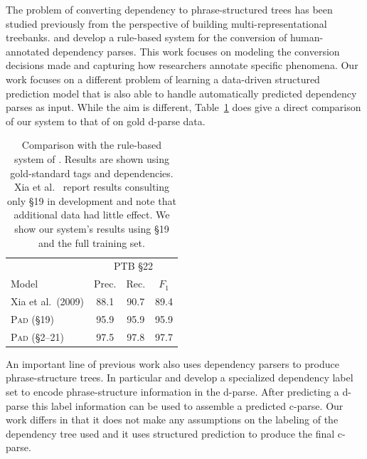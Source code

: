 \documentclass[11pt,letterpaper]{article}
\newcommand{\ParseName}{\textsc{Pad}\xspace}
\newcommand{\nascomment}[1]{\textcolor{blue}{\bf \small [#1 --nas]}}
\begin{document}
The problem of converting dependency to phrase-structured trees has
been studied previously from the perspective of building
multi-representational treebanks.   and
 develop a rule-based system for the
conversion of human-annotated dependency parses. This work focuses on
modeling the conversion decisions made and capturing how researchers
annotate specific phenomena. Our work focuses on a different problem
of learning a data-driven structured prediction model that is also
able to handle automatically predicted dependency parses as
input. While the aim is different, Table~\ref{tab:convert} does give a
direct comparison of our system to that of  on 
gold d-parse data.


\begin{table}
  \centering
  \small
  \begin{tabular}{lccc}

    \toprule
    & \multicolumn{3}{c}{PTB \S 22} \\
    Model & Prec. & Rec. & $F_1$  \\
    \midrule

   
    Xia et al.~(2009)    & 88.1 & 90.7 & 89.4 \\
    \ParseName{} (\S 19)  & 95.9 & 95.9 & 95.9    \\
    \ParseName{}  (\S 2--21) & 97.5 & 97.8 & 97.7    \\
    \bottomrule

  \end{tabular}
  \caption{Comparison with the rule-based system of .
    Results are shown using gold-standard tags and
    dependencies.  Xia et al.~
 report results consulting only \S 19 in development and
note that additional data had little effect.  We show our system's
results using \S 19 and the full training set. 
  \label{tab:convert}}
\end{table}


An important line of previous work also uses dependency parsers to
produce phrase-structure trees. In particular 
and  develop a specialized dependency label
set to encode phrase-structure information in the d-parse. After
predicting a d-parse this label information can be used to assemble
a predicted c-parse. Our work differs in that it does not make any
assumptions on the labeling of the dependency tree used and it uses  
 structured prediction to produce the final c-parse.
\end{document}
